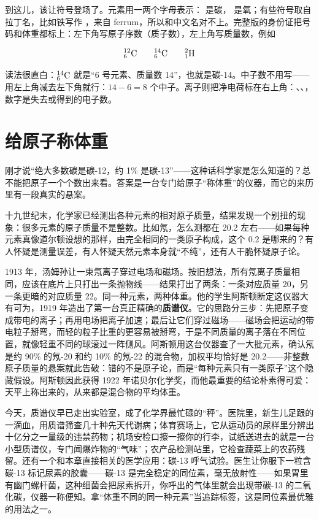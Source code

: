 到这儿，该让符号登场了。元素用一两个字母表示： 是碳， 是氧；有些符号取自拉丁名，比如铁写作 ，来自 ferrum，所以和中文名对不上。完整版的身份证把号码和体重都标上：左下角写原子序数（质子数），左上角写质量数，例如

\[{}^{12}_{6}\mathrm{C} \qquad {}^{14}_{6}\mathrm{C} \qquad {}^{2}_{1}\mathrm{H}\]

读法很直白：${}^{14}_{6}\mathrm{C}$ 就是“6 号元素、质量数 14”，也就是碳-14。中子数不用写——用左上角减去左下角就行：$14-6=8$ 个中子。离子则把净电荷标在右上角：、、，数字是失去或得到的电子数。

\section{给原子称体重}

\begin{zhengju}
刚才说“绝大多数碳是碳-12，约 1\% 是碳-13”——这种话科学家是怎么知道的？总不能把原子一个个数出来看。答案是一台专门给原子“称体重”的仪器，而它的来历里有一段真实的悬案。

十九世纪末，化学家已经测出各种元素的相对原子质量，结果发现一个别扭的现象：很多元素的原子质量不是整数。比如氖，怎么测都在 20.2 左右——如果每种元素真像道尔顿设想的那样，由完全相同的一类原子构成，这个 0.2 是哪来的？有人怀疑是测量误差，有人怀疑天然元素本身就“不纯”，还有人干脆怀疑原子论。

1913 年，汤姆孙让一束氖离子穿过电场和磁场。按旧想法，所有氖离子质量相同，应该在底片上只打出一条抛物线——结果打出了两条：一条对应质量 20，另一条更暗的对应质量 22。同一种元素，两种体重。他的学生阿斯顿断定这仪器大有可为，1919 年造出了第一台真正精确的\textbf{质谱仪}。它的思路分三步：先把原子变成带电的离子；再用电场把离子加速；最后让它们穿过磁场——磁场会把运动的带电粒子掰弯，而轻的粒子比重的更容易被掰弯，于是不同质量的离子落在不同位置，就像轻重不同的球滚过一阵侧风。阿斯顿用这台仪器查了一大批元素，确认氖是约 90\% 的氖-20 和约 10\% 的氖-22 的混合物，加权平均恰好是 20.2——非整数原子质量的悬案就此告破：错的不是原子论，而是“每种元素只有一类原子”这个隐藏假设。阿斯顿因此获得 1922 年诺贝尔化学奖，而他最重要的结论朴素得可爱：天平上称出来的，从来都是混合物的平均体重。
\end{zhengju}

今天，质谱仪早已走出实验室，成了化学界最忙碌的“秤”。医院里，新生儿足跟的一滴血，用质谱筛查几十种先天代谢病；体育赛场上，它从运动员的尿样里分辨出十亿分之一量级的违禁药物；机场安检口擦一擦你的行李，试纸送进去的就是一台小型质谱仪，专门闻爆炸物的“气味”；农产品检测站里，它检查蔬菜上的农药残留。还有一个和本章直接相关的医学应用：碳-13 呼气试验。医生让你服下一粒含碳-13 标记尿素的胶囊——碳-13 是完全稳定的同位素，毫无放射性——如果胃里有幽门螺杆菌，这种细菌会把尿素拆开，你呼出的气体里就会出现带碳-13 的二氧化碳，仪器一称便知。拿“体重不同的同一种元素”当追踪标签，这是同位素最优雅的用法之一。

